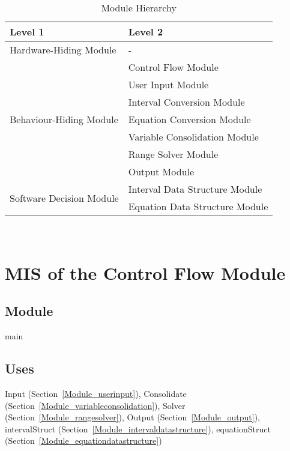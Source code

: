 \documentclass[12pt, titlepage]{article}
\begin{document}
\begin{table}[h!]
	\centering
	\begin{tabular}{p{} p{}}
		\toprule
		\textbf{Level 1} & \textbf{Level 2}\\
		\midrule
		
		{Hardware-Hiding Module} & - \\
		\midrule
		
		\multirow{7}{0.29\textwidth}{Behaviour-Hiding Module} & Control Flow 
		Module \\
		& User Input Module \\
		& Interval Conversion Module \\
		& Equation Conversion Module \\
		& Variable Consolidation Module \\
		& Range Solver Module \\
		& Output Module \\
		\midrule
		
		\multirow{2}{0.29\textwidth}{Software Decision Module} & Interval Data 
		Structure Module \\
		& Equation Data Structure Module \\
		\bottomrule
		
	\end{tabular}
	\caption{Module Hierarchy}
	\label{TblMH}
\end{table}

\newpage
~\newpage

\section{MIS of the Control Flow Module} 
\label{Module_controlflow}

\subsection{Module}

main

\subsection{Uses}

Input (Section~\ref{Module_userinput}), Consolidate 
(Section~\ref{Module_variableconsolidation}), Solver 
(Section~\ref{Module_rangesolver}), Output (Section~\ref{Module_output}), 
intervalStruct (Section~\ref{Module_intervaldatastructure}), equationStruct 
(Section~\ref{Module_equationdatastructure})
\end{document}
